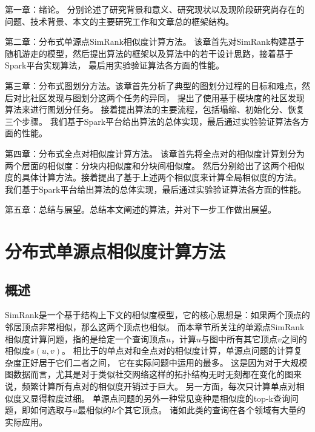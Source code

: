 \documentclass[master]{njuthesis}
\begin{document}
第一章：绪论。 分别论述了研究背景和意义、研究现状以及现阶段研究尚存在的问题、技术背景、本文的主要研究工作和文章总的框架结构。

第二章：分布式单源点SimRank相似度计算方法。 
该章首先对SimRank构建基于随机游走的模型，然后提出算法的框架以及算法中的若干设计思路，接着基于Spark平台实现算法，
最后用实验验证算法各方面的性能。

第三章：分布式图划分方法。该章首先分析了典型的图划分过程的目标和难点，然后对比社区发现与图划分这两个任务的异同，
提出了使用基于模块度的社区发现算法来进行图划分任务。 接着提出算法的主要流程，包括塌缩、初始化分、恢复三个步骤。
我们基于Spark平台给出算法的总体实现，最后通过实验验证算法各方面的性能。

第四章：分布式全点对相似度计算方法。 该章首先将全点对的相似度计算划分为两个层面的相似度：分块内相似度和分块间相似度。
然后分别给出了这两个相似度的具体计算方法。接着提出了基于上述两个相似度来计算全局相似度的方法。
我们基于Spark平台给出算法的总体实现，最后通过实验验证算法各方面的性能。

第五章：总结与展望。总结本文阐述的算法，并对下一步工作做出展望。


\chapter{分布式单源点相似度计算方法}\label{chapter_sssSimRank}
\section{概述}
SimRank是一个基于结构上下文的相似度模型，它的核心思想是：如果两个顶点的邻居顶点非常相似，那么这两个顶点也相似。
而本章节所关注的单源点SimRank相似度计算问题，指的是给定一个查询顶点$u$，计算$u$与图中所有其它顶点$v$之间的相似度$s(u,v)$。
相比于的单点对和全点对的相似度计算，单源点问题的计算复杂度正好居于它们二者之间，
它在实际问题中运用的最多。
这是因为对于大规模图数据而言，尤其是对于类似社交网络这样的拓扑结构无时无刻都在变化的图来说，频繁计算所有点对的相似度开销过于巨大。
另一方面，每次只计算单点对相似度又显得粒度过细。
单源点问题的另外一种常见变种是相似度的top\string-k查询问题，即如何选取与$u$最相似的$k$个其它顶点。
诸如此类的查询在各个领域有大量的实际应用。
\end{document}
